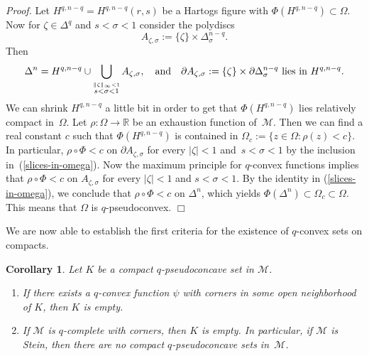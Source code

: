 \documentclass[11pt,a4paper]{article}
\newtheorem{cor}[lem]{Corollary}
\newenvironment{proof}{\noindent\textit{Proof. }}{\hfill $\Box$\linebreak}
\newcommand{\RR}{\mathbb{R}}
\newcommand{\Mcal}{\mathcal{M}}
\newcommand{\qand}{\quad \hbox{and} \quad}
\begin{document}
\begin{proof} Let $H^{q,n-q}=H^{q,n-q}(r,s)$ be a Hartogs figure with $\Phi(H^{q,n-q}) \subset \Omega$. Now for $\zeta \in \Delta^q$ and $s < \sigma < 1$ consider the polydiscs 
\[
A_{\zeta, \sigma} := \{\zeta\} \times \Delta_{\sigma}^{n-q}.
\]
Then 
\begin{eqnarray}\label{slices-in-omega}
\Delta^n = H^{q,n-q} \cup \bigcup_{\stackrel{\|\zeta\|_{\infty}<1}{s < \sigma < 1}} A_{\zeta,\sigma},
\qand \partial A_{\zeta,\sigma} := \{\zeta\} \times \partial \Delta_{\sigma}^{n-q} \ \text{lies in}\ H^{q,n-q}.
\end{eqnarray}
We can shrink $H^{q,n-q}$ a little bit in order to get that $\Phi(H^{q,n-q})$ lies relatively compact in~$\Omega$. Let $\rho:\Omega \to \RR$ be an exhaustion function of~$\Mcal$. Then we can find a real constant $c$ such that $\Phi(H^{q,n-q})$ is contained in $\Omega_c:=\{z \in \Omega : \rho(z)< c\}$. In particular, $\rho \circ \Phi < c$ on $\partial A_{\zeta,\sigma}$ for every $|\zeta|<1$ and~$s < \sigma < 1$ by the inclusion in~(\ref{slices-in-omega}). Now the maximum principle for $q$-convex functions implies that $\rho \circ \Phi< c$ on $A_{\zeta,\sigma}$ for every $|\zeta|<1$ and $s < \sigma < 1$. By the identity in (\ref{slices-in-omega}), we conclude that $\rho \circ \Phi < c$ on $\Delta^n$, which yields $\Phi(\Delta^n) \subset \Omega_c \subset \Omega$. This means that $\Omega$ is $q$-pseudoconvex.
\end{proof}



We are now able to establish the first criteria for the existence of $q$-convex sets on compacts.

\begin{cor}\label{cor-exist-q-convex} Let $K$ be a compact $q$-pseudoconcave set in $\Mcal$. 

\begin{enumerate}

\item If there exists a $q$-convex function $\psi$ with corners in some open neighborhood of $K$, then $K$ is empty.

\item If $\Mcal$ is $q$-complete with corners, then $K$ is empty. In particular, if $\Mcal$ is Stein, then there are no compact $q$-pseudoconcave sets in~$\Mcal$.

\end{enumerate}

\end{cor}
\end{document}
